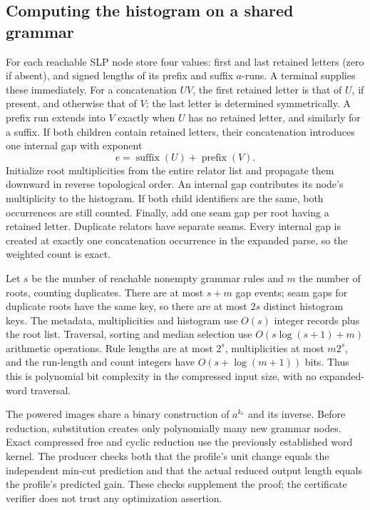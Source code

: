 \subsection{Computing the histogram on a shared grammar}

For each reachable SLP node store four values: first and last retained
letters (zero if absent), and signed lengths of its prefix and suffix
$a$-runs. A terminal supplies these immediately. For a concatenation $UV$,
the first retained letter is that of $U$, if present, and otherwise that
of $V$; the last letter is determined symmetrically. A prefix run extends
into $V$ exactly when $U$ has no retained letter, and similarly for a suffix.
If both children contain retained letters, their concatenation introduces
one internal gap with exponent
\[
 e=\operatorname{suffix}(U)+\operatorname{prefix}(V).
\]
Initialize root multiplicities from the entire relator list and propagate
them downward in reverse topological order. An internal gap contributes
its node's multiplicity to the histogram. If both child identifiers are
the same, both occurrences are still counted. Finally, add one seam gap
per root having a retained letter. Duplicate relators have separate seams.
Every internal gap is created at exactly one concatenation occurrence in
the expanded parse, so the weighted count is exact.

Let $s$ be the number of reachable nonempty grammar rules and $m$ the
number of roots, counting duplicates. There are at most $s+m$ gap events;
seam gaps for duplicate roots have the same key, so there are at most
$2s$ distinct histogram keys. The metadata, multiplicities and histogram
use $O(s)$ integer records plus the root list. Traversal, sorting and median
selection use $O(s\log(s+1)+m)$ arithmetic operations. Rule lengths are
at most $2^s$, multiplicities at most $m2^s$, and the run-length and count integers
have $O(s+\log(m+1))$ bits. Thus this is polynomial bit complexity in the
compressed input size, with no expanded-word traversal.

The powered images share a binary construction of $a^{k_*}$ and its
inverse. Before reduction, substitution creates only polynomially many
new grammar nodes. Exact compressed free and cyclic reduction use the
previously established word kernel. The producer checks both that the
profile's unit change equals the independent min-cut prediction and that
the actual reduced output length equals the profile's predicted gain.
These checks supplement the proof; the certificate verifier does not trust
any optimization assertion.

